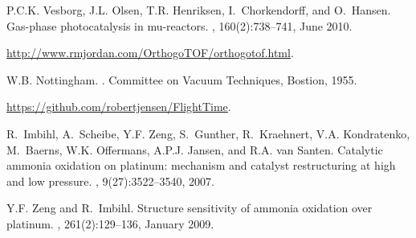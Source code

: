 \documentclass[aip,rsi]{revtex4-1}
\begin{document}
\begin{thebibliography}{10}
P.C.K. Vesborg, J.L. Olsen, T.R. Henriksen, I.~Chorkendorff, and O.~Hansen.
\newblock Gas-phase photocatalysis in mu-reactors.
, 160(2):738--741, June 2010.

\url{http://www.rmjordan.com/OrthogoTOF/orthogotof.html}.

W.B. Nottingham.
.
\newblock Committee on Vacuum Techniques, Bostion, 1955.

\url{https://github.com/robertjensen/FlightTime}.

R.~Imbihl, A.~Scheibe, Y.F. Zeng, S.~Gunther, R.~Kraehnert, V.A. Kondratenko,
  M.~Baerns, W.K. Offermans, A.P.J. Jansen, and R.A. van Santen.
\newblock Catalytic ammonia oxidation on platinum: mechanism and catalyst
  restructuring at high and low pressure.
, 9(27):3522--3540, 2007.

Y.F. Zeng and R.~Imbihl.
\newblock Structure sensitivity of ammonia oxidation over platinum.
, 261(2):129--136, January 2009.

\end{thebibliography}
\end{document}
